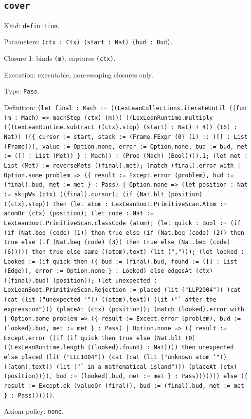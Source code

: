 \documentclass[11pt]{article}
\begin{document}
\subsection*{\texttt{cover}}
\noindent Kind: \texttt{definition}.\par
\noindent Parameters: \texttt{(ctx : Ctx) (start : Nat) (bud : Bud)}.\par
\noindent Closure 1: binds \texttt{(m)}, captures \texttt{(ctx)}.\par
\noindent Execution: executable, non-escaping closures only.\par
\noindent Type: \texttt{Pass}.\par
\noindent Definition: \texttt{(let final : Mach := ((LexLeanCollections.iterateUntil ((fun (m : Mach) => machStep (ctx) (m))) ((LexLeanRuntime.multiply (((LexLeanRuntime.subtract ((ctx).stop) (start) : Nat) + 4)) (16) : Nat)) ((\{ cursor := start, stack := (Frame.FExpr (0) (1) :: ([] : List (Frame))), value := Option.none, error := Option.none, bud := bud, met := ([] : List (Met)) \} : Mach)) : (Prod (Mach) (Bool)))).1; (let met : List (Met) := reverseMets ((final).met); (match (final).error with | Option.some problem => (\{ result := Except.error (problem), bud := (final).bud, met := met \} : Pass) | Option.none => (let position : Nat := skipWs (ctx) ((final).cursor); (if (Nat.blt (position) ((ctx).stop)) then (let atom : LexLeanBoot.PrimitiveScan.Atom := atomOr (ctx) (position); (let code : Nat := LexLeanBoot.PrimitiveScan.classCode (atom); (let quick : Bool := (if (if (Nat.beq (code) (1)) then true else (if (Nat.beq (code) (2)) then true else (if (Nat.beq (code) (3)) then true else (Nat.beq (code) (6))))) then true else same ((atom).text) (lit (","))); (let looked : Looked := (if quick then (\{ bud := (final).bud, found := ([] : List (Edge)), error := Option.none \} : Looked) else edgesAt (ctx) ((final).bud) (position)); (let unexpected : LexLeanBoot.PrimitiveScan.Rejection := placed (lit ("LLP2004")) (cat (cat (lit ("unexpected `")) ((atom).text)) (lit ("` after the expression"))) (placeAt (ctx) (position)); (match (looked).error with | Option.some problem => (\{ result := Except.error (problem), bud := (looked).bud, met := met \} : Pass) | Option.none => (\{ result := Except.error ((if (if quick then true else (Nat.blt (0) ((LexLeanRuntime.length ((looked).found) : Nat)))) then unexpected else placed (lit ("LLL1004")) (cat (cat (lit ("unknown atom `")) ((atom).text)) (lit ("` in a mathematical island"))) (placeAt (ctx) (position)))), bud := (looked).bud, met := met \} : Pass))))))) else (\{ result := Except.ok (valueOr (final)), bud := (final).bud, met := met \} : Pass))))))}.\par
\noindent Axiom policy: \texttt{none}.\par
\end{document}

